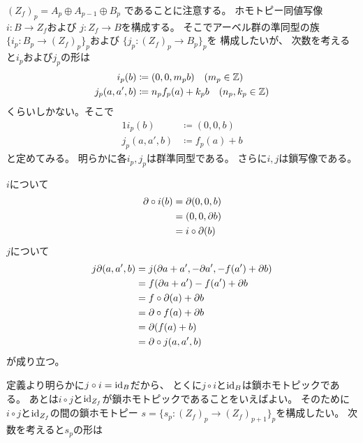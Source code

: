 \documentclass[report]{jlreq}
\begin{document}
\begin{answer}
    $(Z_f)_p = A_{p} \oplus A_{p - 1} \oplus B_{p}$
    であることに注意する。
    ホモトピー同値写像$i \colon B \to Z_f$および
    $j \colon Z_f \to B$を構成する。
    そこでアーベル群の準同型の族
    $\{ i_p \colon B_p \to (Z_f)_p \}_p$および
    $\{ j_p \colon (Z_f)_p \to B_p \}_p$を
    構成したいが、
    次数を考えると$i_p$および$j_p$の形は
    \begin{alignat}{1}
        i_{p}(b) &\coloneqq (0, 0, m_p b)
            \quad (m_p \in \mathbb{Z}) \\
        j_{p}(a, a', b) &\coloneqq n_p f_{p}(a) + k_p b
            \quad (n_p, k_p \in \mathbb{Z})
    \end{alignat}
    くらいしかない。そこで
    \begin{alignat}{1}
        i_{p}(b) &\coloneqq (0, 0, b) \\
        j_{p}(a, a', b) &\coloneqq f_{p}(a) + b
    \end{alignat}
    と定めてみる。
    明らかに各$i_p, j_p$は群準同型である。
    さらに$i, j$は鎖写像である。
    \begin{innerproof}
        $i$について
        \begin{alignat}{1}
            \partial \circ i(b)
                &= \partial (0, 0, b) \\
                &= (0, 0, \partial b) \\
                &= i \circ \partial (b)
        \end{alignat}
        $j$について
        \begin{alignat}{1}
            j \partial (a, a', b)
                &= j (\partial a + a', - \partial a', - f(a') + \partial b) \\
                &= f(\partial a + a') - f(a') + \partial b \\
                &= f \circ \partial (a) + \partial b \\
                &= \partial \circ f(a) + \partial b \\
                &= \partial (f(a) + b) \\
                &= \partial \circ j (a, a', b)
        \end{alignat}
        が成り立つ。
    \end{innerproof}
    定義より明らかに$j \circ i = \mathrm{id}_B$だから、
    とくに$j \circ i$と$\mathrm{id}_B$は鎖ホモトピックである。
    あとは$i \circ j$と$\mathrm{id}_{Z_f}$が鎖ホモトピックであることをいえばよい。
    そのために$i \circ j$と$\mathrm{id}_{Z_f}$の間の鎖ホモトピー
    $s = \{ s_p \colon (Z_f)_p \to (Z_f)_{p + 1} \}_p$を構成したい。
    次数を考えると$s_p$の形は

\end{answer}
\end{document}
